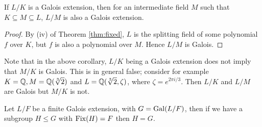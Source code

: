 \begin{corollary} \label{thm:galois-intermediate}
	If $L/K$ is a Galois extension, then for an intermediate field $M$ such that $K \subseteq M \subseteq L$, $L/M$ is also a Galois extension. 
\end{corollary}
\begin{proof}
	By (iv) of Theorem \ref{thm:fixed}, $L$ is the splitting field of some polynomial $f$ over $K$, but $f$ is also a polynomial over $M$. Hence $L/M$ is Galois.
\end{proof}

\begin{example}
	Note that in the above corollary, $L/K$ being a Galois extension does not imply that $M/K$ is Galois. This is in general false; consider for example $K = \mathbb Q, M = \mathbb Q(\sqrt[3]{2})$ and $L = \mathbb Q(\sqrt[3]{2}, \zeta)$, where $\zeta = e^{2\pi i / 3}$. Then $L/K$ and $L/M$ are Galois but $M/K$ is not. 
\end{example}


%





%
%
%



\begin{theorem}\label{thm:equal-subgroup-fixed-points}
    Let $L/F$ be a finite Galois extension, with $G=\operatorname{Gal}(L/F)$, then if we have a subgroup $H\leq G$ with $\operatorname{Fix}(H)=F$ then $H=G$.
\end{theorem}

